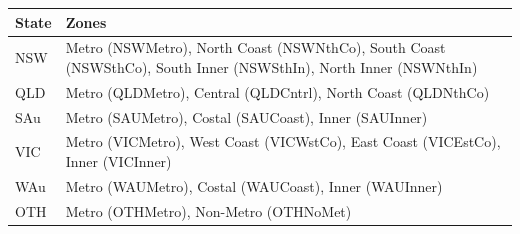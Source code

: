 \documentclass[]{book}
\begin{document}
\begin{longtable}[]{@{}ll@{}}
\toprule
\begin{minipage}[b]{0.09\columnwidth}\raggedright
State\strut
\end{minipage} & \begin{minipage}[b]{0.86\columnwidth}\raggedright
Zones\strut
\end{minipage}\tabularnewline
\midrule
\endhead
\begin{minipage}[t]{0.09\columnwidth}\raggedright
NSW\strut
\end{minipage} & \begin{minipage}[t]{0.86\columnwidth}\raggedright
Metro (NSWMetro), North Coast (NSWNthCo), South Coast (NSWSthCo), South Inner (NSWSthIn), North Inner (NSWNthIn)\strut
\end{minipage}\tabularnewline
\begin{minipage}[t]{0.09\columnwidth}\raggedright
QLD\strut
\end{minipage} & \begin{minipage}[t]{0.86\columnwidth}\raggedright
Metro (QLDMetro), Central (QLDCntrl), North Coast (QLDNthCo)\strut
\end{minipage}\tabularnewline
\begin{minipage}[t]{0.09\columnwidth}\raggedright
SAu\strut
\end{minipage} & \begin{minipage}[t]{0.86\columnwidth}\raggedright
Metro (SAUMetro), Costal (SAUCoast), Inner (SAUInner)\strut
\end{minipage}\tabularnewline
\begin{minipage}[t]{0.09\columnwidth}\raggedright
VIC\strut
\end{minipage} & \begin{minipage}[t]{0.86\columnwidth}\raggedright
Metro (VICMetro), West Coast (VICWstCo), East Coast (VICEstCo), Inner (VICInner)\strut
\end{minipage}\tabularnewline
\begin{minipage}[t]{0.09\columnwidth}\raggedright
WAu\strut
\end{minipage} & \begin{minipage}[t]{0.86\columnwidth}\raggedright
Metro (WAUMetro), Costal (WAUCoast), Inner (WAUInner)\strut
\end{minipage}\tabularnewline
\begin{minipage}[t]{0.09\columnwidth}\raggedright
OTH\strut
\end{minipage} & \begin{minipage}[t]{0.86\columnwidth}\raggedright
Metro (OTHMetro), Non-Metro (OTHNoMet)\strut
\end{minipage}\tabularnewline
\bottomrule
\end{longtable}
\end{document}
